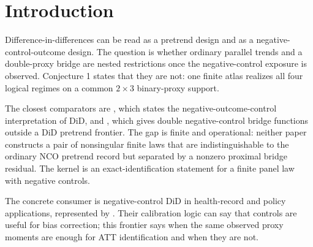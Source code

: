 \documentclass[11pt]{article}
\theoremstyle{definition}
\theoremstyle{plain}
\theoremstyle{remark}
\begin{document}
\section{Introduction}
Difference-in-differences can be read as a pretrend design and as a negative-control-outcome design. The question is whether ordinary parallel trends and a double-proxy bridge are nested restrictions once the negative-control exposure is observed. Conjecture 1 states that they are not: one finite atlas realizes all four logical regimes on a common \(2\times3\) binary-proxy support.

The closest comparators are \citet[Sec.~2, Eq.~(1)]{SoferRichardsonColicinoSchwartzTchetgen2016}, which states the negative-outcome-control interpretation of DiD, and \citet[Sec.~3, bridge equations]{MiaoShiLiTchetgen2024}, which gives double negative-control bridge functions outside a DiD pretrend frontier. The gap is finite and operational: neither paper constructs a pair of nonsingular finite laws that are indistinguishable to the ordinary NCO pretrend record but separated by a nonzero proximal bridge residual. The kernel is an exact-identification statement for a finite panel law with negative controls.

The concrete consumer is negative-control DiD in health-record and policy applications, represented by \citet{ZhangZhangWangEtAl2025}. Their calibration logic can say that controls are useful for bias correction; this frontier says when the same observed proxy moments are enough for ATT identification and when they are not.
\end{document}
